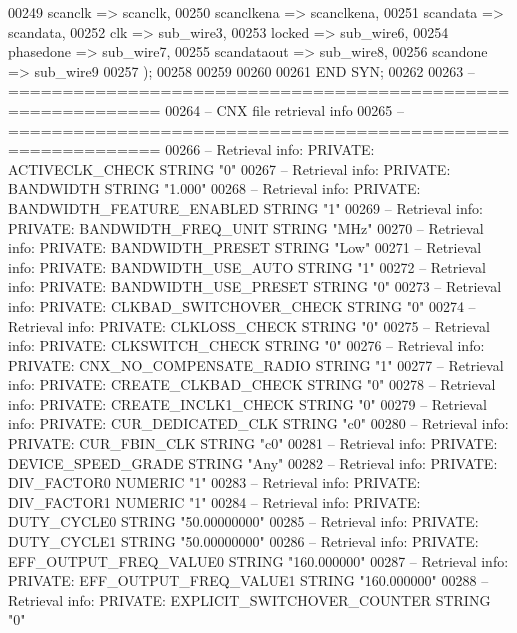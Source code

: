 \begin{DoxyCode}
{00249         scanclk => scanclk,
00250         scanclkena => scanclkena,
00251         scandata => scandata,
00252         clk => sub_wire3,
00253         locked => sub_wire6,
00254         phasedone => sub_wire7,
00255         scandataout => sub_wire8,
00256         scandone => sub_wire9
00257     \textcolor{vhdlchar}{)};
00258 
00259 
00260 
00261 \textcolor{keywordflow}{END} \textcolor{vhdlchar}{SYN};
00262 
00263 \textcolor{keyword}{-- ============================================================}
00264 \textcolor{keyword}{-- CNX file retrieval info}
00265 \textcolor{keyword}{-- ============================================================}
00266 \textcolor{keyword}{-- Retrieval info: PRIVATE: ACTIVECLK\_CHECK STRING "0"}
00267 \textcolor{keyword}{-- Retrieval info: PRIVATE: BANDWIDTH STRING "1.000"}
00268 \textcolor{keyword}{-- Retrieval info: PRIVATE: BANDWIDTH\_FEATURE\_ENABLED STRING "1"}
00269 \textcolor{keyword}{-- Retrieval info: PRIVATE: BANDWIDTH\_FREQ\_UNIT STRING "MHz"}
00270 \textcolor{keyword}{-- Retrieval info: PRIVATE: BANDWIDTH\_PRESET STRING "Low"}
00271 \textcolor{keyword}{-- Retrieval info: PRIVATE: BANDWIDTH\_USE\_AUTO STRING "1"}
00272 \textcolor{keyword}{-- Retrieval info: PRIVATE: BANDWIDTH\_USE\_PRESET STRING "0"}
00273 \textcolor{keyword}{-- Retrieval info: PRIVATE: CLKBAD\_SWITCHOVER\_CHECK STRING "0"}
00274 \textcolor{keyword}{-- Retrieval info: PRIVATE: CLKLOSS\_CHECK STRING "0"}
00275 \textcolor{keyword}{-- Retrieval info: PRIVATE: CLKSWITCH\_CHECK STRING "0"}
00276 \textcolor{keyword}{-- Retrieval info: PRIVATE: CNX\_NO\_COMPENSATE\_RADIO STRING "1"}
00277 \textcolor{keyword}{-- Retrieval info: PRIVATE: CREATE\_CLKBAD\_CHECK STRING "0"}
00278 \textcolor{keyword}{-- Retrieval info: PRIVATE: CREATE\_INCLK1\_CHECK STRING "0"}
00279 \textcolor{keyword}{-- Retrieval info: PRIVATE: CUR\_DEDICATED\_CLK STRING "c0"}
00280 \textcolor{keyword}{-- Retrieval info: PRIVATE: CUR\_FBIN\_CLK STRING "c0"}
00281 \textcolor{keyword}{-- Retrieval info: PRIVATE: DEVICE\_SPEED\_GRADE STRING "Any"}
00282 \textcolor{keyword}{-- Retrieval info: PRIVATE: DIV\_FACTOR0 NUMERIC "1"}
00283 \textcolor{keyword}{-- Retrieval info: PRIVATE: DIV\_FACTOR1 NUMERIC "1"}
00284 \textcolor{keyword}{-- Retrieval info: PRIVATE: DUTY\_CYCLE0 STRING "50.00000000"}
00285 \textcolor{keyword}{-- Retrieval info: PRIVATE: DUTY\_CYCLE1 STRING "50.00000000"}
00286 \textcolor{keyword}{-- Retrieval info: PRIVATE: EFF\_OUTPUT\_FREQ\_VALUE0 STRING "160.000000"}
00287 \textcolor{keyword}{-- Retrieval info: PRIVATE: EFF\_OUTPUT\_FREQ\_VALUE1 STRING "160.000000"}
00288 \textcolor{keyword}{-- Retrieval info: PRIVATE: EXPLICIT\_SWITCHOVER\_COUNTER STRING "0"}
}
\end{DoxyCode}
